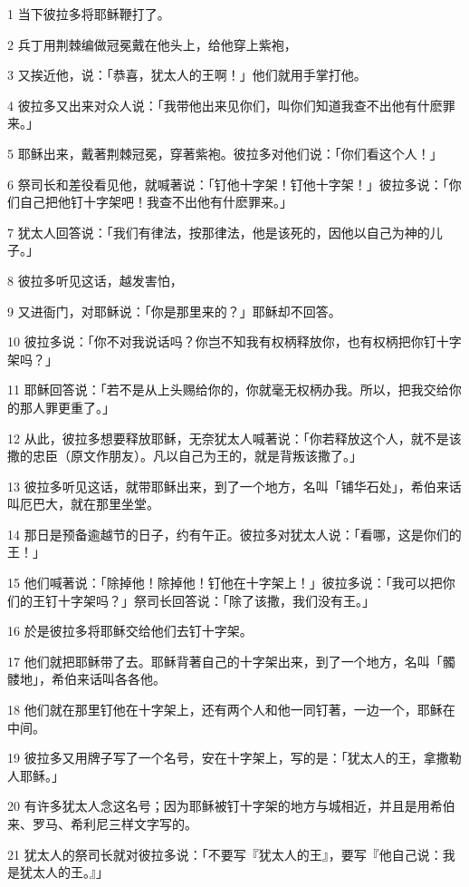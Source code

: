 \par 1 当下彼拉多将耶稣鞭打了。
\par 2 兵丁用荆棘编做冠冕戴在他头上，给他穿上紫袍，
\par 3 又挨近他，说：「恭喜，犹太人的王啊！」他们就用手掌打他。
\par 4 彼拉多又出来对众人说：「我带他出来见你们，叫你们知道我查不出他有什麽罪来。」
\par 5 耶稣出来，戴著荆棘冠冕，穿著紫袍。彼拉多对他们说：「你们看这个人！」
\par 6 祭司长和差役看见他，就喊著说：「钉他十字架！钉他十字架！」彼拉多说：「你们自己把他钉十字架吧！我查不出他有什麽罪来。」
\par 7 犹太人回答说：「我们有律法，按那律法，他是该死的，因他以自己为神的儿子。」
\par 8 彼拉多听见这话，越发害怕，
\par 9 又进衙门，对耶稣说：「你是那里来的？」耶稣却不回答。
\par 10 彼拉多说：「你不对我说话吗？你岂不知我有权柄释放你，也有权柄把你钉十字架吗？」
\par 11 耶稣回答说：「若不是从上头赐给你的，你就毫无权柄办我。所以，把我交给你的那人罪更重了。」
\par 12 从此，彼拉多想要释放耶稣，无奈犹太人喊著说：「你若释放这个人，就不是该撒的忠臣（原文作朋友）。凡以自己为王的，就是背叛该撒了。」
\par 13 彼拉多听见这话，就带耶稣出来，到了一个地方，名叫「铺华石处」，希伯来话叫厄巴大，就在那里坐堂。
\par 14 那日是预备逾越节的日子，约有午正。彼拉多对犹太人说：「看哪，这是你们的王！」
\par 15 他们喊著说：「除掉他！除掉他！钉他在十字架上！」彼拉多说：「我可以把你们的王钉十字架吗？」祭司长回答说：「除了该撒，我们没有王。」
\par 16 於是彼拉多将耶稣交给他们去钉十字架。
\par 17 他们就把耶稣带了去。耶稣背著自己的十字架出来，到了一个地方，名叫「髑髅地」，希伯来话叫各各他。
\par 18 他们就在那里钉他在十字架上，还有两个人和他一同钉著，一边一个，耶稣在中间。
\par 19 彼拉多又用牌子写了一个名号，安在十字架上，写的是：「犹太人的王，拿撒勒人耶稣。」
\par 20 有许多犹太人念这名号；因为耶稣被钉十字架的地方与城相近，并且是用希伯来、罗马、希利尼三样文字写的。
\par 21 犹太人的祭司长就对彼拉多说：「不要写『犹太人的王』，要写『他自己说：我是犹太人的王。』」
